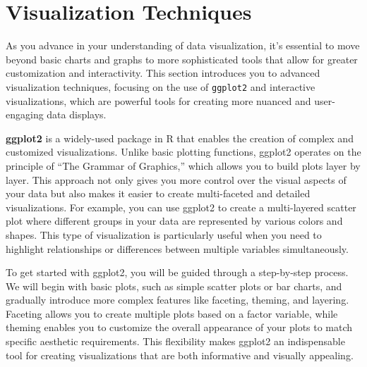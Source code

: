 \documentclass[
]{book}
\begin{document}
\section{Visualization Techniques}\label{visualization-techniques}

As you advance in your understanding of data visualization, it's essential to move beyond basic charts and graphs to more sophisticated tools that allow for greater customization and interactivity. This section introduces you to advanced visualization techniques, focusing on the use of \texttt{ggplot2} and interactive visualizations, which are powerful tools for creating more nuanced and user-engaging data displays.

\textbf{ggplot2} is a widely-used package in R that enables the creation of complex and customized visualizations. Unlike basic plotting functions, ggplot2 operates on the principle of ``The Grammar of Graphics,'' which allows you to build plots layer by layer. This approach not only gives you more control over the visual aspects of your data but also makes it easier to create multi-faceted and detailed visualizations. For example, you can use ggplot2 to create a multi-layered scatter plot where different groups in your data are represented by various colors and shapes. This type of visualization is particularly useful when you need to highlight relationships or differences between multiple variables simultaneously.

To get started with ggplot2, you will be guided through a step-by-step process. We will begin with basic plots, such as simple scatter plots or bar charts, and gradually introduce more complex features like faceting, theming, and layering. Faceting allows you to create multiple plots based on a factor variable, while theming enables you to customize the overall appearance of your plots to match specific aesthetic requirements. This flexibility makes ggplot2 an indispensable tool for creating visualizations that are both informative and visually appealing.
\end{document}
